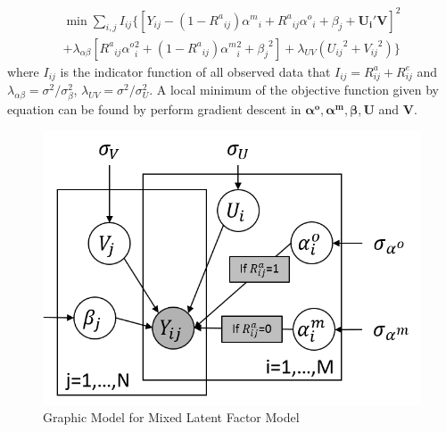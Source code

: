 \documentclass[preprint,12pt]{elsarticle}
\begin{document}
\begin{multline}
\min \sum\limits_{i,j} {{I_{ij}}\{ {{[{Y_{ij}} - (1 - {R^a}_{ij}){\alpha ^m}_i + {R^a}_{ij}{\alpha ^o}_i + {\beta _j} + {{\mathbf{U}}_{\mathbf{i}}}{\mathbf{'V}}]}^2}} \\ + {\lambda _{\alpha \beta }}[{R^a}_{ij}{\alpha ^o}{_i^2} + (1 - {R^a}_{ij}){\alpha ^m}{_i^2} + {\beta _j}^2] + {\lambda _{UV}}({U_{ij}}^2 + {V_{ij}}^2)\} 
\end{multline}
where $I_{ij}$ is the indicator function of all observed data that $I_{ij}=R^a_{ij}+R^e_{ij}$ and $\lambda_{\alpha \beta}=\sigma^2/\sigma_{\beta}^2$, $\lambda_{UV}=\sigma^2/\sigma_{U}^2$. A local minimum of the objective function given by equation can be found by perform gradient descent in ${{\mathbf{\alpha }}^{\mathbf{o}}}{\mathbf{,}}{{\mathbf{\alpha }}^{\mathbf{m}}}{\mathbf{,\beta ,U}}$ and $\mathbf{V}$.\\

\begin{figure}[!htb]
\centering
\includegraphics[scale=0.6]{MLFM.png}
\caption{Graphic Model for Mixed Latent Factor Model}
\label{fig:MLFM}
\end{figure}
\end{document}
